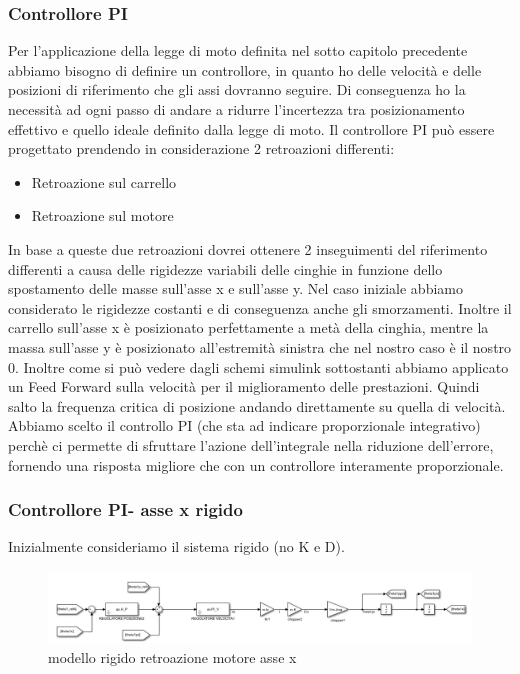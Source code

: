 \documentclass{article}
\begin{document}
\subsubsection{Controllore PI}
Per l'applicazione della legge di moto definita nel sotto capitolo precedente abbiamo bisogno di definire un controllore, in quanto ho delle velocità e delle posizioni di riferimento che gli assi dovranno seguire. Di conseguenza ho la necessità ad ogni passo di andare a ridurre l'incertezza tra posizionamento effettivo e quello ideale definito dalla legge di moto.
Il controllore PI può essere progettato prendendo in considerazione 2 retroazioni differenti:
\begin{itemize}
    \item Retroazione sul carrello
    \item Retroazione sul motore
\end{itemize}
In base a queste due retroazioni dovrei ottenere 2 inseguimenti del riferimento differenti a causa delle rigidezze variabili delle cinghie in funzione dello spostamento delle masse sull'asse x e sull'asse y.
Nel caso iniziale abbiamo considerato le rigidezze costanti e di conseguenza anche gli smorzamenti. Inoltre il carrello sull'asse x è posizionato perfettamente a metà della cinghia, mentre la massa sull'asse y è posizionato all'estremità sinistra che nel nostro caso è il nostro 0.
Inoltre come si può vedere dagli schemi simulink sottostanti abbiamo applicato un Feed Forward sulla velocità per il miglioramento delle prestazioni. Quindi salto la frequenza critica di posizione andando direttamente su quella di velocità.
Abbiamo scelto il controllo PI (che sta ad indicare proporzionale integrativo) perchè ci permette di sfruttare l'azione dell'integrale nella riduzione dell'errore, fornendo una risposta migliore che con un controllore interamente proporzionale.


\subsubsection{Controllore PI- asse x rigido}
Inizialmente consideriamo il sistema rigido (no K e D).


\begin{figure}[H]
\centering
\includegraphics[width=.8\textwidth]{./simulink/ldm_rigido/PIDrigmot.png}
\caption{modello rigido retroazione motore asse x}
\end{figure}
\end{document}

